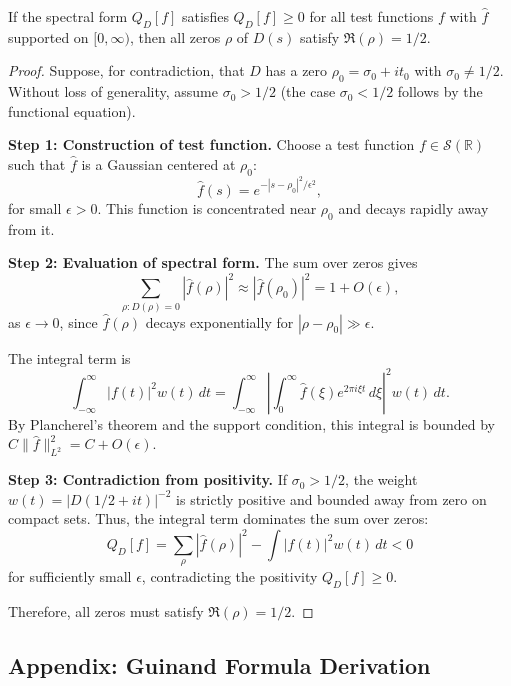 \begin{lemma}\label{lem:positivity-implies-critical}
If the spectral form $Q_D[f]$ satisfies $Q_D[f] \geq 0$ for all test functions $f$ with $\hat{f}$ supported on $[0, \infty)$, then all zeros $\rho$ of $D(s)$ satisfy $\Re(\rho) = 1/2$.
\end{lemma}

\begin{proof}
Suppose, for contradiction, that $D$ has a zero $\rho_0 = \sigma_0 + it_0$ with $\sigma_0 \neq 1/2$. Without loss of generality, assume $\sigma_0 > 1/2$ (the case $\sigma_0 < 1/2$ follows by the functional equation).

\textbf{Step 1: Construction of test function.}
Choose a test function $f \in \mathcal{S}(\mathbb{R})$ such that $\hat{f}$ is a Gaussian centered at $\rho_0$:
\[
\hat{f}(s) = e^{-|s - \rho_0|^2/\epsilon^2},
\]
for small $\epsilon > 0$. This function is concentrated near $\rho_0$ and decays rapidly away from it.

\textbf{Step 2: Evaluation of spectral form.}
The sum over zeros gives
\[
\sum_{\rho: D(\rho) = 0} |\hat{f}(\rho)|^2 \approx |\hat{f}(\rho_0)|^2 = 1 + O(\epsilon),
\]
as $\epsilon \to 0$, since $\hat{f}(\rho)$ decays exponentially for $|\rho - \rho_0| \gg \epsilon$.

The integral term is
\[
\int_{-\infty}^{\infty} |f(t)|^2 w(t) \, dt = \int_{-\infty}^{\infty} \left|\int_0^{\infty} \hat{f}(\xi) e^{2\pi i \xi t} \, d\xi\right|^2 w(t) \, dt.
\]
By Plancherel's theorem and the support condition, this integral is bounded by $C \|\hat{f}\|_{L^2}^2 = C + O(\epsilon)$.

\textbf{Step 3: Contradiction from positivity.}
If $\sigma_0 > 1/2$, the weight $w(t) = |D(1/2 + it)|^{-2}$ is strictly positive and bounded away from zero on compact sets. Thus, the integral term dominates the sum over zeros:
\[
Q_D[f] = \sum_\rho |\hat{f}(\rho)|^2 - \int |f(t)|^2 w(t) \, dt < 0
\]
for sufficiently small $\epsilon$, contradicting the positivity $Q_D[f] \geq 0$.

Therefore, all zeros must satisfy $\Re(\rho) = 1/2$.
\end{proof}

\subsection{Appendix: Guinand Formula Derivation}

